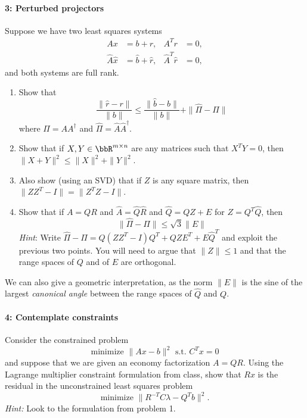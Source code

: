 \documentclass[12pt, leqno]{article} %
\begin{document}
\paragraph*{3: Perturbed projectors}
Suppose we have two least squares systems
\begin{align*}
  A x &= b + r, & A^T r &= 0, \\
  \hat{A} \hat{x} &= \hat{b} + \hat{r}, & \hat{A}^T \hat{r} &= 0,
\end{align*}
and both systems are full rank.
\begin{enumerate}
\item
  Show that
  \[
    \frac{\|\hat{r}-r\|}{\|b\|} \leq \frac{\|\hat{b}-b\|}{\|b\|}  + \|\hat{\Pi}-\Pi\|
  \]
  where $\Pi = AA^\dagger$ and $\hat{\Pi} = \hat{A} \hat{A}^\dagger$.
\item
  Show that if $X, Y \in \bbR^{m \times n}$ are any matrices such that
  $X^T Y = 0$, then $\|X+Y\|^2 \leq \|X\|^2 + \|Y\|^2$.
\item Also show (using an SVD) that if $Z$ is any square matrix, then
  $\|ZZ^T-I\| = \|Z^T Z-I\|$.
\item
  Show that if $A = QR$ and $\hat{A} = \hat{Q} \hat{R}$ and
  $\hat{Q} = QZ + E$ for $Z = Q^T \hat{Q}$, then
  \[
    \|\hat{\Pi}-\Pi\| \leq \sqrt{3} \|E\|
  \]
  {\em Hint}: Write $\hat{\Pi}-\Pi = Q(ZZ^T-I)Q^T + QZE^T + E \hat{Q}^T$
  and exploit the previous two points.  You will need to argue
  that $\|Z\| \leq 1$ and that the range spaces of $Q$ and of $E$
  are orthogonal.
\end{enumerate}
We can also give a geometric interpretation, as
the norm $\|E\|$ is the sine of the largest {\em canonical
angle} between the range spaces of $\hat{Q}$ and $Q$.

\paragraph*{4: Contemplate constraints}
Consider the constrained problem
\[
  \mbox{minimize } \|Ax-b\|^2 \mbox{ s.t. } C^T x = 0
\]
and suppose that we are given an economy factorization $A = QR$.
Using the Lagrange multiplier constraint formulation from class,
show that $Rx$ is the residual in the unconstrained least squares
problem
\[
  \mbox{minimize } \|R^{-T} C \lambda - Q^T b\|^2.
\]
{\em Hint:} Look to the formulation from problem 1.
\end{document}
